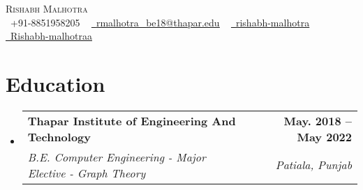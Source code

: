 \documentclass[letterpaper,11pt]{article}
\makeatletter
\newcommand{\resumeSubheading}[4]{
  \vspace{-2pt}\item
    \begin{tabular*}{1.0\textwidth}[t]{l@{\extracolsep{\fill}}r}
      \textbf{#1} & \textbf{\small #2} \\
      \textit{\small#3} & \textit{\small #4} \\
    \end{tabular*}\vspace{-7pt}
}
\newcommand{\resumeSubHeadingListStart}{\begin{itemize}[leftmargin=0.0in, label={}]}
\newcommand{\resumeSubHeadingListEnd}{\end{itemize}}
\makeatother
\begin{document}

\begin{center}
    {\Huge \scshape Rishabh Malhotra} \\ \vspace{3pt}
    \small \raisebox{-0.1\height}\faPhone\ +91-8851958205 ~ \href{mailto:rmalhotra_be18@thapar.edu}{\raisebox{-0.2\height}\faEnvelope\  \underline{rmalhotra\_be18@thapar.edu}} ~ 
    \href{https://linkedin.com/in/rishabh-malhotra-4536a418b/}{\raisebox{-0.2\height}\faLinkedin\ \underline{rishabh-malhotra}}  ~
    \href{https://github.com/Rishabh-malhotraa}{\raisebox{-0.2\height}\faGithub\ \underline{Rishabh-malhotraa}}
    \vspace{-8pt}
\end{center}


\section{Education}
  \resumeSubHeadingListStart
    \resumeSubheading
      {Thapar Institute of Engineering And Technology}{May. 2018 -- May 2022}
      {B.E. Computer Engineering - Major Elective - Graph Theory}{Patiala, Punjab}
  \resumeSubHeadingListEnd

\end{document}
